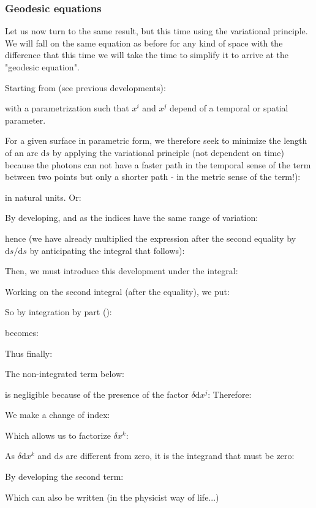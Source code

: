	\subsubsection{Geodesic equations}\label{geodesic equation}
	Let us now turn to the same result, but this time using the variational principle. We will fall on the same equation as before for any kind of space with the difference that this time we will take the time to simplify it to arrive at the "geodesic equation".

	Starting from (see previous developments):
	
	with a parametrization such that $x^i$ and $x^j$ depend of a temporal or spatial parameter.

	For a given surface in parametric form, we therefore seek to minimize the length of an arc $\mathrm{d}s$ by applying the variational principle (not dependent on time) because the photons can not have a faster path in the temporal sense of the term between two points but only a shorter path - in the metric sense of the term!):
	
	in natural units. Or:
	
	By developing, and as the indices have the same range of variation:
	
	hence (we have already multiplied the expression after the second equality by $\mathrm{d}s/\mathrm{d}s$ by anticipating the integral that follows):
	
	Then, we must introduce this development under the integral:
	
	Working on the second integral (after the equality), we put:
	
	So by integration by part ():
	
	becomes:
	
	Thus finally:
	
	The non-integrated term below:
	
	is negligible because of the presence of the factor $\delta \mathrm{d}x^j$:
	Therefore:
	
	We make a change of index:
	
	Which allows us to factorize $\delta x^k$:
	
	As $\delta \mathrm{d}x^k$ and $\mathrm{d}s$ are different from zero, it is the integrand that must be zero:
	
	By developing the second term:
	
	Which can also be written (in the physicist way of life...)
	
